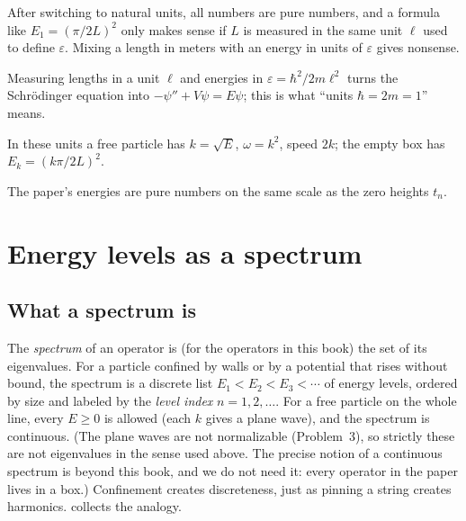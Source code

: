 \begin{pitfall}
After switching to natural units, all numbers are pure numbers, and a formula like $E_1=(\pi/2L)^2$ only makes sense if $L$ is measured in the same unit $\ell$ used to define $\varepsilon$. Mixing a length in meters with an energy in units of $\varepsilon$ gives nonsense.
\end{pitfall}

\begin{keyideas}
\item Measuring lengths in a unit $\ell$ and energies in $\varepsilon=\hbar^2/2m\ell^2$ turns the Schr\"odinger equation into $-\psi''+V\psi=E\psi$; this is what ``units $\hbar=2m=1$'' means.
\item In these units a free particle has $k=\sqrt{E}$, $\omega=k^2$, speed $2k$; the empty box has $E_k=(k\pi/2L)^2$.
\item The paper's energies are pure numbers on the same scale as the zero heights $t_n$.
\end{keyideas}

\section{Energy levels as a spectrum}\label{sec:schrodinger-spectrum}

\subsection{What a spectrum is}

The \emph{spectrum} of an operator is (for the operators in this book) the set of its eigenvalues. For a particle confined by walls or by a potential that rises without bound, the spectrum is a discrete list $E_1<E_2<E_3<\cdots$ of energy levels, ordered by size and labeled by the \emph{level index} $n=1,2,\dots$. For a free particle on the whole line, every $E\ge0$ is allowed (each $k$ gives a plane wave), and the spectrum is continuous. (The plane waves are not normalizable (Problem~3), so strictly these are not eigenvalues in the sense used above. The precise notion of a continuous spectrum is beyond this book, and we do not need it: every operator in the paper lives in a box.) Confinement creates discreteness, just as pinning a string creates harmonics.  collects the analogy.

